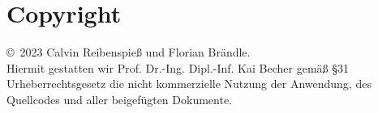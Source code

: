 
\chapter{Copyright}

\copyright \, 2023 Calvin Reibenspieß und Florian Brändle.\\
Hiermit gestatten wir Prof. Dr.-Ing. Dipl.-Inf. Kai Becher gemäß \S 31 Urheberrechtsgesetz die nicht kommerzielle Nutzung der Anwendung, des Quellcodes und aller beigefügten Dokumente.
